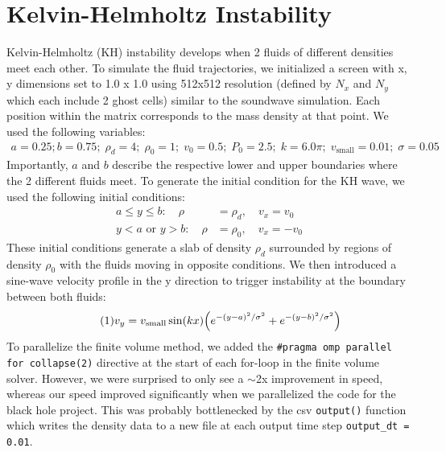 \documentclass{article}
\begin{document}



\section*{Kelvin-Helmholtz Instability}


Kelvin-Helmholtz (KH) instability develops when 2 fluids of different
densities meet each other. To simulate the fluid trajectories, we
initialized a screen with x, y dimensions set to 1.0 x 1.0 using 512x512
resolution (defined by $N_x$ and $N_y$ which each include 2 ghost cells) similar 
to the soundwave simulation.
Each position within the matrix corresponds to the mass density at that
point. We used the following variables:
\begin{align*}
    a = 0.25;b = 0.75;\; \rho_{d} = 4;\; \rho_{0} = 1;\; v_{0} = 0.5;\;
    P_{0} = 2.5;\; k = 6.0\pi;\; v_\text{small} = 0.01;\; \sigma = 0.05
\end{align*}
Importantly, $a$ and $b$ describe the respective lower and upper boundaries
where the 2 different fluids meet. To generate the initial condition for
the KH wave, we used the following initial conditions:
\begin{align*}
    a \leq y \leq b:\quad         \rho &= \rho_d,\quad v_x= v_0 \\
    y < a \textrm{ or } y > b:\quad \rho &= \rho_0,\quad v_x = -v_0
\end{align*}
These initial conditions generate a slab of density \(\rho_d\)
surrounded by regions of density \(\rho_0\) with the fluids moving in
opposite conditions. We then introduced a sine-wave velocity profile in
the y direction to trigger instability at the boundary between both
fluids:
\begin{align*} \tag{1} \label{eq:vy}
    v_y = v_\text{small} \sin(kx) \qt(
        e^{-(y - a)^2 / \sigma^2} + e^{-(y - b)^2 / \sigma^2}
    )
\end{align*}
To parallelize the finite volume method, we added the \texttt{\#pragma omp
parallel for collapse(2)} directive at the start of each for-loop in the
finite volume solver. However, we were surprised to only see a
$\sim$2x improvement in speed, whereas our speed improved
significantly when we parallelized the code for the black hole project.
This was probably bottlenecked by the csv \texttt{output()} function
which writes the density data to a new file at each output time step \texttt{output\_dt = 0.01}.
\end{document}
